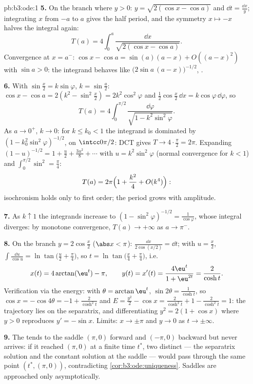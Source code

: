 \begin{solution}{pb:b3:ode:1}
\textbf{5.} On the branch where $y > 0$: $y = \sqrt{2(\cos x
- \cos a)}$ and $\dd t = \frac{\dd x}{y}$; integrating $x$
from $-a$ to $a$ gives the half period, and the symmetry $x
\mapsto -x$ halves the integral again:
\[
T(a) = 4\int_0^a\frac{\dd x}{\sqrt{2(\cos x - \cos a)}} .
\]
Convergence at $x = a^-$: $\cos x - \cos a = \sin(a)(a - x) +
O((a-x)^2)$ with $\sin a > 0$: the integrand behaves like
$\bigl(2\sin a\,(a - x)\bigr)^{-1/2}$, .

\textbf{6.} With $\sin\frac x2 = k\sin\varphi$, $k =
\sin\frac a2$: $\cos x - \cos a = 2(k^2 - \sin^2\frac x2)
= 2k^2\cos^2\varphi$ and $\frac12\cos\frac x2\,\dd x =
k\cos\varphi\,\dd\varphi$, so
\[
T(a) = 4\int_0^{\pi/2}
\frac{\dd\varphi}{\sqrt{1 - k^2\sin^2\varphi}} .
\]
As $a \to 0^+$, $k \to 0$: for $k \leq k_0 < 1$ the
integrand is dominated by $(1 - k_0^2\sin^2\varphi)^{-1/2}$,
 on $\intcc0{\pi/2}$: DCT gives $T \to
4\cdot\frac\pi2 = 2\pi$. Expanding $(1 - u)^{-1/2} = 1 +
\frac u2 + \frac{3u^2}8 + \cdots$ with $u =
k^2\sin^2\varphi$ (normal convergence for $k < 1$) and
$\int_0^{\pi/2}\sin^2 = \frac\pi4$:
\[
T(a) = 2\pi\Bigl(1 + \frac{k^2}{4} + O(k^4)\Bigr) :
\]
isochronism holds only to first order; the period grows with
amplitude.

\textbf{7.} As $k \uparrow 1$ the integrands increase to $(1
- \sin^2\varphi)^{-1/2} = \frac1{\cos\varphi}$, whose
integral diverges: by monotone convergence, $T(a) \to
+\infty$ as $a \to \pi^-$.

\textbf{8.} On the branch $y = 2\cos\frac x2$ ($\abs x <
\pi$): $\frac{\dd x}{2\cos(x/2)} = \dd t$; with $u = \frac
x2$, $\int\frac{\dd u}{\cos u} =
\ln\tan\bigl(\frac u2 + \frac\pi4\bigr)$, so $t =
\ln\tan\bigl(\frac x4 + \frac\pi4\bigr)$, i.e.
\[
x(t) = 4\arctan(\eu^t) - \pi,
\qquad y(t) = x'(t) = \frac{4\eu^t}{1 + \eu^{2t}} =
\frac{2}{\cosh t} .
\]
Verification via the energy: with $\theta = \arctan\eu^t$,
$\sin2\theta = \frac1{\cosh t}$, so $\cos x = -\cos4\theta =
-1 + \frac{2}{\cosh^2t}$ and $E = \frac{y^2}2 - \cos x =
\frac2{\cosh^2t} + 1 - \frac2{\cosh^2t} = 1$: the trajectory
lies on the separatrix, and differentiating $y^2 = 2(1 +
\cos x)$ where $y > 0$ reproduces $y' = -\sin x$. Limits: $x
\to \pm\pi$ and $y \to 0$ as $t \to \pm\infty$.

\textbf{9.} The  tends to the saddle $(\pi, 0)$ forward
and $(-\pi, 0)$ backward but never arrives: if it reached
$(\pi, 0)$ at a finite time $t^*$, two distinct  --- the separatrix solution and the constant
solution at the saddle --- would pass through the same point
$(t^*, (\pi, 0))$, contradicting
\cref{cor:b3:ode:uniqueness}. Saddles are approached only
asymptotically.


\end{solution}
